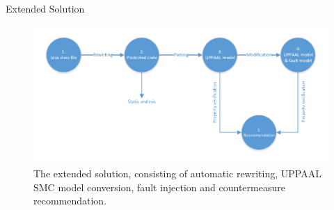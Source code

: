 
\begin{frame}[fragile]{Extended Solution}


\begin{figure}
\centering
\includegraphics[scale=0.65]{figures/workflow.pdf}
\caption{\footnotesize The extended solution, consisting of automatic rewriting, UPPAAL SMC model conversion, fault injection and countermeasure recommendation.}
\label{test}
\end{figure}
\end{frame}